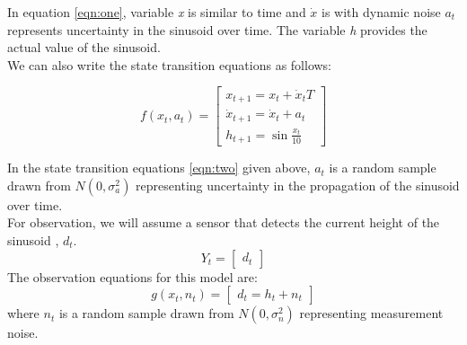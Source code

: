\documentclass{article}
\begin{document}
\indent
In equation \ref{eqn:one}, variable \textit{x} is similar to time and $\dot{x}$ is with dynamic noise $a_t$ represents uncertainty in the sinusoid over time. The variable \textit{h} provides the actual value of the sinusoid. \\
We can also write the state transition equations as follows:

\begin{equation}
\label{eqn:two}
f(x_t,a_t) = \begin{bmatrix}
x_{t+1} = x_t + \dot{x}_t T \\
\dot{x}_{t+1} = \dot{x}_t + a_t \\
h_{t+1} = \sin \frac{x_t}{10}
\end{bmatrix}
\end{equation}

\indent
In the state transition equations \ref{eqn:two} given above, $a_t$ is a random sample drawn from $N(0,\sigma_a^2)$ representing uncertainty in the propagation of the sinusoid over time. \\
\indent
For observation, we will assume a sensor that detects the current height of the sinusoid , $d_t$.
\begin{equation}
Y_t = \begin{bmatrix}
d_t
\end{bmatrix}
\end{equation}
\indent
The observation equations for this model are:
\begin{equation}
g(x_t,n_t) = \begin{bmatrix}
d_t = h_t + n_t
\end{bmatrix}
\end{equation}
\indent
where $n_t$ is a random sample drawn from $N(0,\sigma_n^2)$ representing measurement noise. \\
\end{document}
